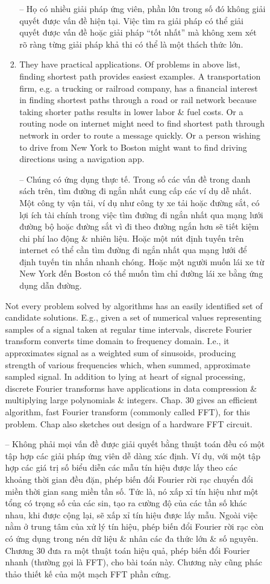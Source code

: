 \documentclass{article}
\begin{document}
\begin{itemize}
\begin{itemize}
\begin{itemize}
\begin{enumerate}
                -- Họ có nhiều giải pháp ứng viên, phần lớn trong số đó không giải quyết được vấn đề hiện tại. Việc tìm ra giải pháp có thể giải quyết được vấn đề hoặc giải pháp ``tốt nhất'' mà không xem xét rõ ràng từng giải pháp khả thi có thể là một thách thức lớn.
                \item They have practical applications. Of problems in above list, finding shortest path provides easiest examples. A transportation firm, e.g. a trucking or railroad company, has a financial interest in finding shortest paths through a road or rail network because taking shorter paths results in lower labor \& fuel costs. Or a routing node on internet might need to find shortest path through network in order to route a message quickly. Or a person wishing to drive from New York to Boston might want to ﬁnd driving directions using a navigation app.
                
                -- Chúng có ứng dụng thực tế. Trong số các vấn đề trong danh sách trên, tìm đường đi ngắn nhất cung cấp các ví dụ dễ nhất. Một công ty vận tải, ví dụ như công ty xe tải hoặc đường sắt, có lợi ích tài chính trong việc tìm đường đi ngắn nhất qua mạng lưới đường bộ hoặc đường sắt vì đi theo đường ngắn hơn sẽ tiết kiệm chi phí lao động \& nhiên liệu. Hoặc một nút định tuyến trên internet có thể cần tìm đường đi ngắn nhất qua mạng lưới để định tuyến tin nhắn nhanh chóng. Hoặc một người muốn lái xe từ New York đến Boston có thể muốn tìm chỉ đường lái xe bằng ứng dụng dẫn đường.
            \end{enumerate}
            Not every problem solved by algorithms has an easily identified set of candidate solutions. E.g., given a set of numerical values representing samples of a signal taken at regular time intervals, discrete Fourier transform converts time domain to frequency domain. I.e., it approximates signal as a weighted sum of sinusoids, producing strength of various frequencies which, when summed, approximate sampled signal. In addition to lying at heart of signal processing, discrete Fourier transforms have applications in data compression \& multiplying large polynomials \& integers. Chap. 30 gives an efficient algorithm, fast Fourier transform (commonly called FFT), for this problem. Chap also sketches out design of a hardware FFT circuit.
            
            -- Không phải mọi vấn đề được giải quyết bằng thuật toán đều có một tập hợp các giải pháp ứng viên dễ dàng xác định. Ví dụ, với một tập hợp các giá trị số biểu diễn các mẫu tín hiệu được lấy theo các khoảng thời gian đều đặn, phép biến đổi Fourier rời rạc chuyển đổi miền thời gian sang miền tần số. Tức là, nó xấp xỉ tín hiệu như một tổng có trọng số của các sin, tạo ra cường độ của các tần số khác nhau, khi được cộng lại, sẽ xấp xỉ tín hiệu được lấy mẫu. Ngoài việc nằm ở trung tâm của xử lý tín hiệu, phép biến đổi Fourier rời rạc còn có ứng dụng trong nén dữ liệu \& nhân các đa thức lớn \& số nguyên. Chương 30 đưa ra một thuật toán hiệu quả, phép biến đổi Fourier nhanh (thường gọi là FFT), cho bài toán này. Chương này cũng phác thảo thiết kế của một mạch FFT phần cứng.
            

\end{itemize}
\end{itemize}
\end{itemize}
\end{document}
